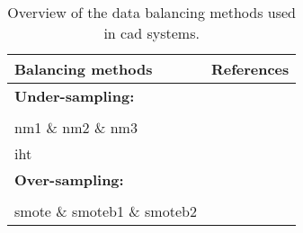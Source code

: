 \begin{table}
  \caption{Overview of the data balancing methods used in \acs*{cad} systems.}
  \centering
  \begin{tabular}{l r}
    \toprule
    \textbf{Balancing methods} & \textbf{References} \\
    \midrule
    \textbf{Under-sampling:} & \\ \\ [-1.5ex]
    \quad \Acl*{nm1} \& \Acl*{nm2} \& \Acl*{nm3} & \cite{Lemaitre2016thesis} \\
    \quad \Acl*{iht} & \cite{Lemaitre2016thesis} \\
    \textbf{Over-sampling:} & \\ \\ [-1.5ex]
    \quad \acs*{smote} \& \acs*{smoteb1} \& \acs*{smoteb2} & \cite{Lemaitre2016thesis} \\
    \bottomrule
  \end{tabular}
  \label{tab:databal}
\end{table}


